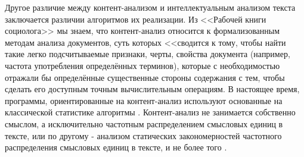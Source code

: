 


Другое различие между контент-анализом и интеллектуальным анализом текста заключается различии алгоритмов их реализации. Из <<Рабочей книги социолога>>\cite{soc_workbook} мы знаем, что контент-анализ относится к формализованным методам анализа документов, суть которых <<сводится к тому, чтобы найти такие легко подсчитываемые признаки, черты, свойства документа (например, частота употребления определённых терминов), которые с необходимостью отражали бы определённые существенные стороны содержания с тем, чтобы сделать его доступным точным вычислительным операциям. В настоящее время, программы, ориентированные на контент-анализ используют основанные на классической статистике алгоритмы \cite[стр. 735]{tm_and_ca}. Контент-анализ не занимается собственно смыслом, а исключительно частотным распределением смысловых единиц в тексте, или по другому - анализом статических закономерностей частотного распределения смысловых единиц в тексте, и не более того \cite[стр. 15]{Averianov2007}. 

